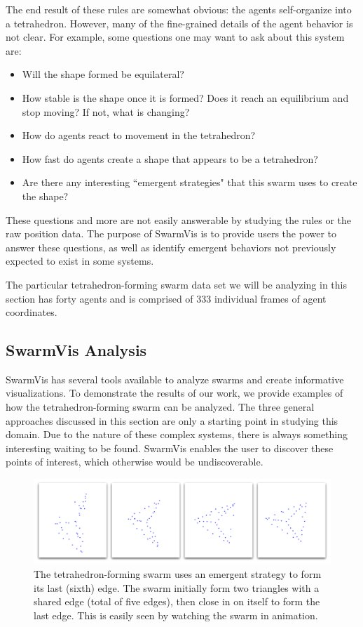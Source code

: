\documentclass[conference]{IEEEtran}
\begin{document}
The end result of these rules are somewhat obvious: the agents self-organize into a tetrahedron.
However, many of the fine-grained details of the agent behavior is not clear.
For example, some questions one may want to ask about this system are: 
\begin{itemize}
\item Will the shape formed be equilateral?
\item How stable is the shape once it is formed? Does it reach an equilibrium and stop moving? If not, what is changing?
\item How do agents react to movement in the tetrahedron?
\item How fast do agents create a shape that appears to be a tetrahedron?
\item Are there any interesting ``emergent strategies" that this swarm uses to create the shape?
\end{itemize}
These questions and  more are not easily answerable by studying the rules or the raw position data.
The purpose of SwarmVis is to provide users the power to answer these questions,
as well as identify emergent behaviors not previously expected to exist in some systems.

The particular tetrahedron-forming swarm data set we will be analyzing in this section has forty agents
and is comprised of 333 individual frames of agent coordinates.

\subsection{SwarmVis Analysis}
SwarmVis has several tools available to analyze swarms and create informative visualizations.
To demonstrate the results of our work, we provide examples of how the tetrahedron-forming swarm can be analyzed.
The three general approaches discussed in this section are only a starting point in studying this domain.
Due to the nature of these complex systems, there is always something interesting waiting to be found.
SwarmVis enables the user to discover these points of interest, which otherwise would be undiscoverable.


\begin{figure}
\centering
\includegraphics[scale=.21]{images/tetraclosing.pdf}
\caption{
The tetrahedron-forming swarm uses an emergent strategy to form its last (sixth) edge.
The swarm initially form two triangles with a shared edge (total of five edges), then
close in on itself to form the last edge. This is easily seen by watching the swarm in animation.}
\label{TetraClosing}
\end{figure}
\end{document}
